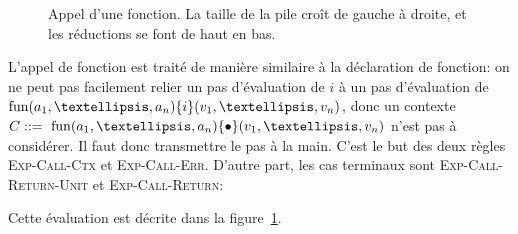 \shorthandoff{!}
\begin{figure}%

  \centering


  \caption[Appel d'une fonction]
  { Appel d'une fonction.
    La taille de la pile croît de gauche à droite,
    et les réductions se font de haut en bas.
  }
\label{fig:fcall-details}

\end{figure}%
\shorthandon{!}

L'appel de fonction est traité de manière similaire à la déclaration de
fonction: on ne peut pas facilement relier un pas d'évaluation de $i$ à un pas
d'évaluation de $\eFun{a_1,…,a_n}{i} (v_1,…,v_n)$, donc un contexte
$C \gramisa \eFun{a_1,…,a_n}{\ctxEmpty} (v_1,…,v_n)$ n'est pas à considérer. Il
faut donc transmettre le pas à la main. C'est le but des deux règles
\textsc{Exp-Call-Ctx} et \textsc{Exp-Call-Err}. D'autre part, les cas terminaux
sont \textsc{Exp-Call-Return-Unit} et \textsc{Exp-Call-Return}:

\begin{mathpar}



\end{mathpar}


Cette évaluation est décrite dans la figure~\ref{fig:fcall-details}.

